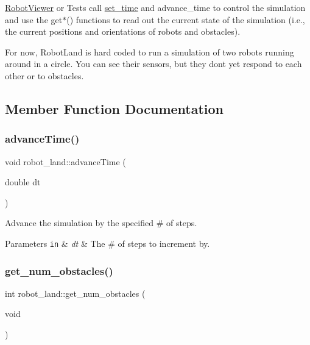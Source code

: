 \hyperlink{classRobotViewer}{Robot\+Viewer} or Tests call \hyperlink{classrobot__land_a9b759efccbcae2be07ead240caec14cf}{set\+\_\+time} and advance\+\_\+time to control the simulation and use the get$\ast$() functions to read out the current state of the simulation (i.\+e., the current positions and orientations of robots and obstacles).

For now, Robot\+Land is hard coded to run a simulation of two robots running around in a circle. You can see their sensors, but they don\textquotesingle{}t yet respond to each other or to obstacles. 

\subsection{Member Function Documentation}
\mbox{\label{classrobot__land_af48446e7dafcf509fd3c13e66e17466b}} 
\subsubsection{\texorpdfstring{advance\+Time()}{advanceTime()}}
{\footnotesize\ttfamily void robot\+\_\+land\+::advance\+Time (\begin{DoxyParamCaption}\item[{double}]{dt }\end{DoxyParamCaption})\hspace{0.3cm}{\ttfamily [inline]}}



Advance the simulation by the specified \# of steps. 


\begin{DoxyParams}[1]{Parameters}
\mbox{\tt in}  & {\em dt} & The \# of steps to increment by. \\
\hline
\end{DoxyParams}
\mbox{\label{classrobot__land_ab6edf762a971b54341c1d0740c2c431d}} 
\subsubsection{\texorpdfstring{get\+\_\+num\+\_\+obstacles()}{get\_num\_obstacles()}}
{\footnotesize\ttfamily int robot\+\_\+land\+::get\+\_\+num\+\_\+obstacles (\begin{DoxyParamCaption}\item[{void}]{ }\end{DoxyParamCaption})}



